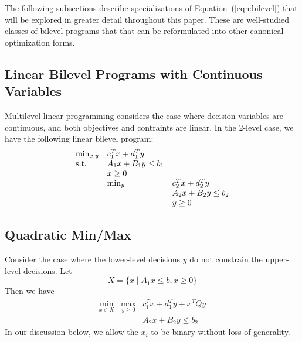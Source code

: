 \label{sec:problems}

The following subsections describe specializations of
Equation~(\ref{eqn:bilevel}) that will be explored in greater detail
throughout this paper.  These are well-studied classes of bilevel
programs that that can be reformulated into other canonical
optimization forms.


\subsection{Linear Bilevel Programs with Continuous Variables}

Multilevel linear programming considers the case where decision
variables are continuous, and both objectives and contraints are
linear.  In the 2-level case, we have the following linear bilevel program:
\begin{equation}
\label{eqn:bilevel_A}
\begin{array}{lll}
\min_{x, y}         & c^T_1 x + d^T_1 y & \\
\textrm{s.t.}                 & A_1 x + B_1 y \leq b_1 & \\
                    & x \geq 0 & \\
                    & \min_{y}  & c^T_2 x + d^T_2 y\\
                    &           & A_2 x + B_2 y \leq b_2\\
                    &           & y \geq 0
\end{array}
\end{equation}


\subsection{Quadratic Min/Max}

Consider the case where the lower-level decisions $y$ do not constrain the upper-level decisions.  Let
\[
X = \{ x \mid A_1 x \leq b, x \geq 0\}
\]
Then we have
\begin{equation}
\label{eqn:bilevel_B}
\begin{array}{lll}
\min_{x \in X} & \max_{y \geq 0} & c^T_1 x + d^T_1 y + x^T Q y\\
& & A_2 x + B_2 y \leq b_2
\end{array}
\end{equation}
In our discussion below, we allow the $x_i$ to be binary without loss of generality.



\label{sec:design}


